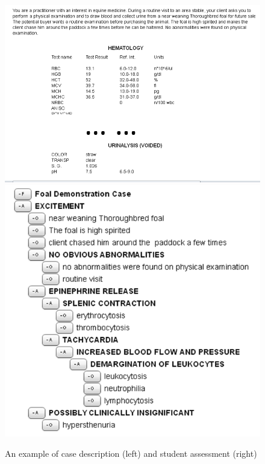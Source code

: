 \begin{figure}[ht]
\begin{centering}
\includegraphics[scale=0.45]{case-desc-small.png}
\includegraphics[scale=0.55]{student-work-small.png}
\end{centering}
\caption{An example of case description (left) and student assessment (right)}
\label{fig:example}
\end{figure}

